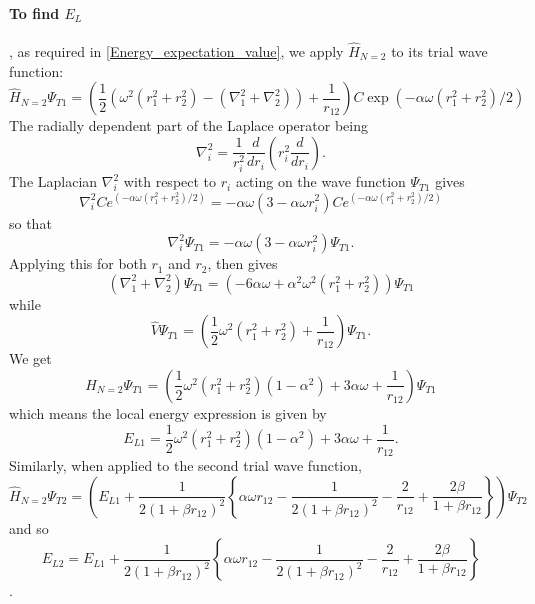 \documentclass[10pt,a4paper]{article}
\begin{document}
\paragraph{To find $E_L$}, as required in \eqref{Energy_expectation_value}, we apply $\hat{H}_{N=2}$ to its trial wave function:
\begin{equation*}
\hat{H}_{N=2}\Psi_{T1} = \left( \frac{1}{2}\left( \omega^2   \left( r_1^2+r_2^2 \right)-\left( \nabla_1^2 + \nabla_2^2 \right)  \right)+\frac{1}{r_{12}} \right)C\exp{\left(-\alpha\omega(r_1^2+r_2^2)/2\right)}
\end{equation*}
The radially dependent part of the Laplace operator being
\begin{equation}
\nabla_i^2 = \frac{1}{r_i^2}\frac{d}{dr_i}\left( r_i^2 \frac{d}{dr_i} \right).
\end{equation}
The Laplacian $\nabla_i^2$ with respect to $r_i$ acting on the wave function $\Psi_{T1}$ gives
\begin{equation}
\nabla_i^2Ce^{\left(-\alpha\omega(r_1^2+r_2^2)/2\right)} = -\alpha\omega \left( 3 -\alpha \omega r_i^2 \right)Ce^{\left(-\alpha\omega(r_1^2+r_2^2)/2\right)}
\end{equation}
so that 
\begin{equation}
\nabla_i^2\Psi_{T1} = -\alpha\omega \left( 3 -\alpha \omega r_i^2 \right)\Psi_{T1}.
\end{equation}
Applying this for both $r_1$ and $r_2$, then gives
\begin{equation}
\left( \nabla_1^2 + \nabla_2^2 \right)\Psi_{T1} = \left( -6\alpha \omega+\alpha^2\omega^2\left( r_1^2+r_2^2 \right) \right)\Psi_{T1}
\end{equation}
while 
\begin{equation}
\hat{V}\Psi_{T1} = \left( \frac{1}{2} \omega^2   \left( r_1^2+r_2^2 \right) +\frac{1}{r_{12}} \right)\Psi_{T1}.
\end{equation}
We get
\begin{equation}
\hat{H}_{N=2}\Psi_{T1} = \left( \frac{1}{2}\omega^2\left( r_1^2+r_2^2\right)\left(1-\alpha^2\right) +3\alpha\omega+\frac{1}{r_{12}} \right)\Psi_{T1}
\end{equation}
which means the local energy expression is given by
\begin{equation}
E_{L1} =  \frac{1}{2}\omega^2\left( r_1^2+r_2^2\right)\left(1-\alpha^2\right) +3\alpha\omega+\frac{1}{r_{12}}.
\end{equation}
Similarly, when applied to the second trial wave function,
\begin{equation*}
\hat{H}_{N=2}\Psi_{T2} = \left( E_{L1}+\frac{1}{2(1+\beta r_{12})^2}\left\{\alpha\omega r_{12}-\frac{1}{2(1+\beta r_{12})^2}-\frac{2}{r_{12}}+\frac{2\beta}{1+\beta r_{12}}\right\} \right)\Psi_{T2}
\end{equation*}
and so 
\begin{equation}
E_{L2} = E_{L1}+\frac{1}{2(1+\beta r_{12})^2}\left\{\alpha\omega r_{12}-\frac{1}{2(1+\beta r_{12})^2}-\frac{2}{r_{12}}+\frac{2\beta}{1+\beta r_{12}}\right\}
\end{equation}
\cite{Problem_set_5}.
\end{document}
